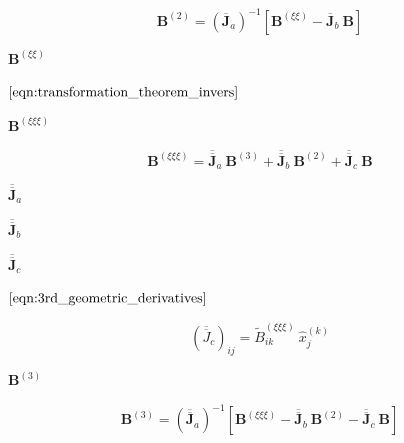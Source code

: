 \documentclass{article}
\begin{document}
\[ \begin{equation}\label{eqn:2nd_derivative}
    \bm{B}^{(2)} = 
    \left(
    \overline{\bm{J}}_a
    \right)^{-1} \left[
    \bm{B}^{(\xi\xi)} - \overline{\bm{J}}_b \ \bm{B}
    \right]
\end{equation} \]
\pagebreak

$ \bm{B}^{(\xi\xi)} $
\pagebreak

$ \ref{eqn:transformation_theorem_invers} $
\pagebreak

$ \bm{B}^{(\xi\xi\xi)} $
\pagebreak

\[ \begin{equation}\label{eqn:3rd_derivative_xi}
    \bm{B}^{(\xi\xi\xi)} = 
        \overline{\overline{\bm{J}}}_a \ \bm{B}^{(3)} 
        + \overline{\overline{\bm{J}}}_b \ \bm{B}^{(2)}
        + \overline{\overline{\bm{J}}}_c \ \bm{B}
\end{equation} \]
\pagebreak

$ \overline{\overline{\bm{J}}}_a $
\pagebreak

$ \overline{\overline{\bm{J}}}_b $
\pagebreak

$ \overline{\overline{\bm{J}}}_c $
\pagebreak

$ \eqref{eqn:3rd_geometric_derivatives} $
\pagebreak

\[ \begin{equation}\label{eqn:3rd_geometric_derivatives}
\left( \overline{\overline{J}}_{c} \right)_{ij}  
= \widetilde{B}^{(\xi\xi\xi)}_{ik} \ \hat{x}_j^{(k)}
\end{equation} \]
\pagebreak

$ \bm{B}^{(3)} $
\pagebreak

\[ \begin{equation}\label{eqn:3rd_derivative}
    \bm{B}^{(3)} = 
    \left(
        \overline{\overline{\bm{J}}}_a
    \right)^{-1} \left[
        \bm{B}^{(\xi\xi\xi)} - \overline{\overline{\bm{J}}}_b \ \bm{B}^{(2)}
        - \overline{\overline{\bm{J}}}_c \ \bm{B}
    \right]
\end{equation} \]
\pagebreak
\end{document}
